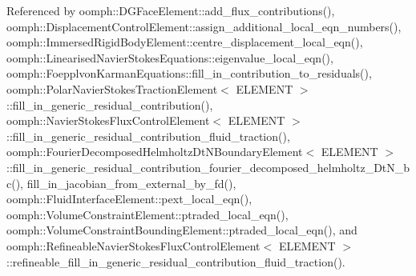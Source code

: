 Referenced by oomph\+::\+D\+G\+Face\+Element\+::add\+\_\+flux\+\_\+contributions(), oomph\+::\+Displacement\+Control\+Element\+::assign\+\_\+additional\+\_\+local\+\_\+eqn\+\_\+numbers(), oomph\+::\+Immersed\+Rigid\+Body\+Element\+::centre\+\_\+displacement\+\_\+local\+\_\+eqn(), oomph\+::\+Linearised\+Navier\+Stokes\+Equations\+::eigenvalue\+\_\+local\+\_\+eqn(), oomph\+::\+Foepplvon\+Karman\+Equations\+::fill\+\_\+in\+\_\+contribution\+\_\+to\+\_\+residuals(), oomph\+::\+Polar\+Navier\+Stokes\+Traction\+Element$<$ E\+L\+E\+M\+E\+N\+T $>$\+::fill\+\_\+in\+\_\+generic\+\_\+residual\+\_\+contribution(), oomph\+::\+Navier\+Stokes\+Flux\+Control\+Element$<$ E\+L\+E\+M\+E\+N\+T $>$\+::fill\+\_\+in\+\_\+generic\+\_\+residual\+\_\+contribution\+\_\+fluid\+\_\+traction(), oomph\+::\+Fourier\+Decomposed\+Helmholtz\+Dt\+N\+Boundary\+Element$<$ E\+L\+E\+M\+E\+N\+T $>$\+::fill\+\_\+in\+\_\+generic\+\_\+residual\+\_\+contribution\+\_\+fourier\+\_\+decomposed\+\_\+helmholtz\+\_\+\+Dt\+N\+\_\+bc(), fill\+\_\+in\+\_\+jacobian\+\_\+from\+\_\+external\+\_\+by\+\_\+fd(), oomph\+::\+Fluid\+Interface\+Element\+::pext\+\_\+local\+\_\+eqn(), oomph\+::\+Volume\+Constraint\+Element\+::ptraded\+\_\+local\+\_\+eqn(), oomph\+::\+Volume\+Constraint\+Bounding\+Element\+::ptraded\+\_\+local\+\_\+eqn(), and oomph\+::\+Refineable\+Navier\+Stokes\+Flux\+Control\+Element$<$ E\+L\+E\+M\+E\+N\+T $>$\+::refineable\+\_\+fill\+\_\+in\+\_\+generic\+\_\+residual\+\_\+contribution\+\_\+fluid\+\_\+traction().

\mbox{\label{classoomph_1_1GeneralisedElement_a2d6e3c918ebc1f270eebdf4eb1027093}} 
